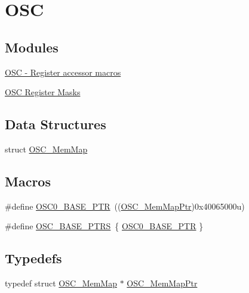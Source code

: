 \hypertarget{group___o_s_c___peripheral}{}\section{O\+SC}
\label{group___o_s_c___peripheral}
\subsection*{Modules}
\begin{DoxyCompactItemize}
\item 
\hyperlink{group___o_s_c___register___accessor___macros}{O\+S\+C -\/ Register accessor macros}
\item 
\hyperlink{group___o_s_c___register___masks}{O\+S\+C Register Masks}
\end{DoxyCompactItemize}
\subsection*{Data Structures}
\begin{DoxyCompactItemize}
\item 
struct \hyperlink{struct_o_s_c___mem_map}{O\+S\+C\+\_\+\+Mem\+Map}
\end{DoxyCompactItemize}
\subsection*{Macros}
\begin{DoxyCompactItemize}
\item 
\#define \hyperlink{group___o_s_c___peripheral_gaab1618c69a91b2e5d3385139b5b566f0}{O\+S\+C0\+\_\+\+B\+A\+S\+E\+\_\+\+P\+TR}~((\hyperlink{group___o_s_c___peripheral_gaaa685163f549fdf24c28ec9b400310b5}{O\+S\+C\+\_\+\+Mem\+Map\+Ptr})0x40065000u)
\item 
\#define \hyperlink{group___o_s_c___peripheral_ga46f69fcb9d660e18b5cbf51adbbcec78}{O\+S\+C\+\_\+\+B\+A\+S\+E\+\_\+\+P\+T\+RS}~\{ \hyperlink{group___o_s_c___peripheral_gaab1618c69a91b2e5d3385139b5b566f0}{O\+S\+C0\+\_\+\+B\+A\+S\+E\+\_\+\+P\+TR} \}
\end{DoxyCompactItemize}
\subsection*{Typedefs}
\begin{DoxyCompactItemize}
\item 
typedef struct \hyperlink{struct_o_s_c___mem_map}{O\+S\+C\+\_\+\+Mem\+Map} $\ast$ \hyperlink{group___o_s_c___peripheral_gaaa685163f549fdf24c28ec9b400310b5}{O\+S\+C\+\_\+\+Mem\+Map\+Ptr}
\end{DoxyCompactItemize}


